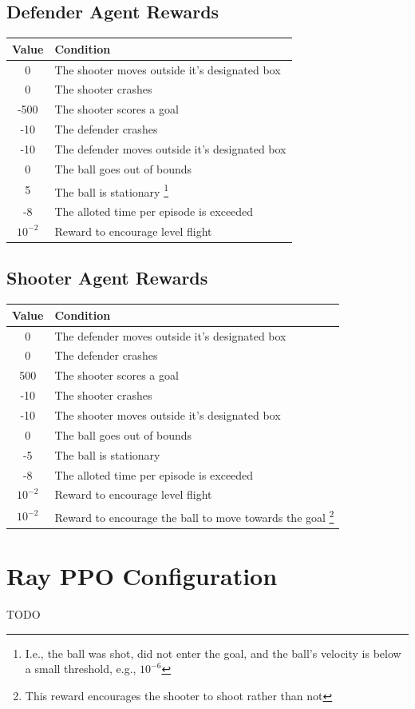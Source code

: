\documentclass{article}
\begin{document}
\subsection{Defender Agent Rewards}
\begin{tabular}{ | c | l | }
\hline
Value & Condition \\ \hline
0 & The shooter moves outside it's designated box \\ \hline
0 & The shooter crashes \\ \hline
-500 & The shooter scores a goal \\ \hline 
-10 & The defender crashes \\ \hline
-10 & The defender moves outside it's designated box \\ \hline 
0 & The ball goes out of bounds \\ \hline 
5 & The ball is stationary \footnote{I.e., the ball was shot, did not enter the goal, and the ball's velocity is below a small threshold, e.g., $10^{-6}$} \\ \hline
-8 & The alloted time per episode is exceeded \\ \hline 
$10^{-2}$ & Reward to encourage level flight \\ \hline
\end{tabular}

\subsection{Shooter Agent Rewards}
\begin{tabular}{ | c | l | }
\hline
Value & Condition \\ \hline
0 & The defender moves outside it's designated box \\ \hline
0 & The defender crashes \\ \hline
500 & The shooter scores a goal \\ \hline 
-10 & The shooter crashes \\ \hline
-10 & The shooter moves outside it's designated box \\ \hline 
0 & The ball goes out of bounds \\ \hline 
-5 & The ball is stationary  \\ \hline
-8 & The alloted time per episode is exceeded \\ \hline 
$10^{-2}$ & Reward to encourage level flight \\ \hline
$10^{-2}$ & Reward to encourage the ball to move towards the goal \footnote{This reward encourages the shooter to shoot rather than not} \\ \hline
\end{tabular}

\section{Ray PPO Configuration} \label{app:ray_config}
TODO


\newpage


\end{document}
